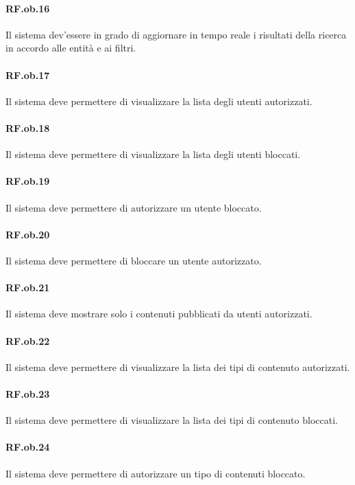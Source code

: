 \documentclass[10pt,a4paper,headinclude,footinclude,hidelinks]{scrreprt} %
\begin{document}
	\paragraph{RF.ob.16} Il sistema dev'essere in grado di aggiornare in tempo reale i risultati della ricerca in accordo alle entità e ai filtri.

	\paragraph{RF.ob.17} Il sistema deve permettere di visualizzare la lista degli utenti autorizzati.

	\paragraph{RF.ob.18} Il sistema deve permettere di visualizzare la lista degli utenti bloccati.

	\paragraph{RF.ob.19} Il sistema deve permettere di autorizzare un utente bloccato.

	\paragraph{RF.ob.20} Il sistema deve permettere di bloccare un utente autorizzato.

	\paragraph{RF.ob.21} Il sistema deve mostrare solo i contenuti pubblicati da utenti autorizzati.

	\paragraph{RF.ob.22} Il sistema deve permettere di visualizzare la lista dei tipi di contenuto autorizzati.

	\paragraph{RF.ob.23} Il sistema deve permettere di visualizzare la lista dei tipi di contenuto bloccati.

	\paragraph{RF.ob.24} Il sistema deve permettere di autorizzare un tipo di contenuti bloccato.
\end{document}
